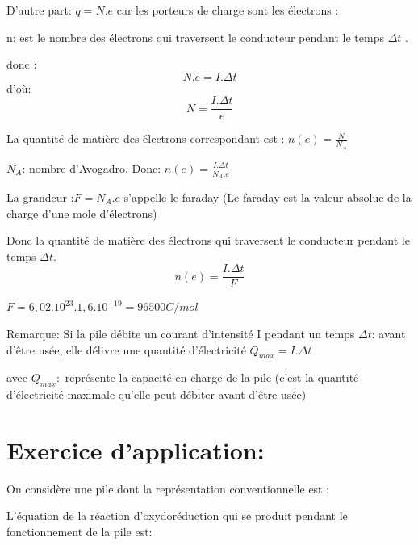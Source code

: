 \documentclass[12pt]{article}
\begin{document}
D'autre part: $q = N.e$ car les porteurs de charge sont les électrons :

n: est le nombre des électrons qui traversent le conducteur pendant le temps $\Delta{t}$ .

donc :$$N.e = I.\Delta{t}$$ d’où: $$N = \frac{I.\Delta{t}}{e}$$

La quantité de matière des électrons correspondant est : $n(e)= \frac{N}{N_A}$ 

$N_A$: nombre d'Avogadro. Donc: $n(e) = \frac{I.\Delta{t}}{N_A.e}$

La grandeur :$F=N_A.e$ s'appelle le faraday (Le faraday est la valeur absolue de la charge d'une mole d'électrons)

Donc la quantité de matière des électrons qui traversent le conducteur pendant le temps $\Delta{t}$.$$n(e)=\frac{I.\Delta{t}}{F}$$

$F = 6,02.10^{23}.1,6.10^{-19}  = 96500C/mol$

\begin{tcolorbox}
Remarque: Si la pile débite un courant d'intensité I pendant un temps $\Delta{t}$: 
avant d'être usée, elle délivre une quantité d'électricité $Q_{max} = I.\Delta{t}$ 

avec $Q_{max} :$ représente la capacité en charge de la pile (c'est la quantité d'électricité maximale qu'elle peut débiter avant d'être usée)



\end{tcolorbox}


\section*{Exercice d'application: }

On considère une pile dont la représentation conventionnelle est : 
\begin{center}

\end{center}
L'équation de la réaction d'oxydoréduction qui se produit pendant le fonctionnement de la pile est:
\end{document}
